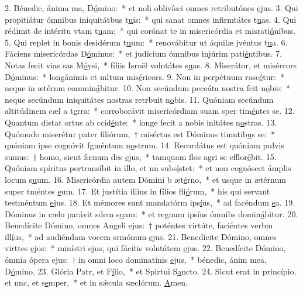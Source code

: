 2. Bénedic, ánima ma, D\uline{ó}mino:~* et noli oblivísci omnes retributónes \uline{e}jus.
3. Qui propitiátur ómnibus iniquitátbus t\uline{u}is:~* qui sanat omnes infirmtátes t\uline{u}as.
4. Qui rédimit de intéritu vtam t\uline{u}am:~* qui corónat te in misericórdia et misrati\uline{ó}nibus.
5. Qui replet in bonis desidérum t\uline{u}um:~* renovábitur ut áquilæ jvéntus t\uline{u}a.
6. Fáciens misericórdas D\uline{ó}minus:~* et judícium ómnibus injúrim pati\uline{é}ntibus.
7. Notas fecit vias sas M\uline{ó}ysi,~* fíliis Israël volntátes s\uline{u}as.
8. Miserátor, et misércors D\uline{ó}minus:~* longánimis et mltum mis\uline{é}ricors.
9. Non in perpétuum rasc\uline{é}tur:~* neque in ætérnm commin\uline{á}bitur.
10. Non secúndum peccáta nostra fcit n\uline{o}bis:~* neque secúndum iniquitátes nostras retrbuit n\uline{o}bis.
11. Quóniam secúndum altitúdinem cæl a t\uline{e}rra:~* corroborávit misericórdiam suam sper tim\uline{é}ntes se.
12. Quantum distat ortus ab ccid\uline{é}nte:~* longe fecit a nobis initátes n\uline{o}stras.
13. Quómodo miserétur pater filiórum,~† misértus est Dóminus timntib\uline{u}s se:~* quóniam ipse cognóvit fgméntum n\uline{o}strum.
14. Recordátus est quóniam pulvis sumus:~† homo, sicut fœnum des \uline{e}jus,~* tamquam flos agri sc efflor\uline{é}bit.
15. Quóniam spíritus pertransíbit in illo, et nn subs\uline{í}stet:~* et non cognóscet ámplis locum s\uline{u}um.
16. Misericórdia autem Dómini b æt\uline{é}rno,~* et usque in ætérnum super tméntes \uline{e}um.
17. Et justítia illíus in fílios fli\uline{ó}rum,~* his qui servant testméntum \uline{e}jus.
18. Et mémores sunt mandatórm ips\uline{í}us,~* ad facéndum \uline{e}a.
19. Dóminus in cælo parávit sdem s\uline{u}am:~* et regnum ipsíus ómnibs domin\uline{á}bitur.
20. Benedícite Dómino, omnes Angeli ejus:~† poténtes virtúte, faciéntes verbm ill\uline{í}us,~* ad audiéndam vocem srmónum \uline{e}jus.
21. Benedícite Dómino, omnes virttes \uline{e}jus:~* minístri ejus, qui fácitis volntátem \uline{e}jus.
22. Benedícite Dómino, ómnia ópera ejus:~† in omni loco dominatinis \uline{e}jus,~* bénedic, ánim mea, D\uline{ó}mino.
23. Glória Patr, et F\uline{í}lio,~* et Spirtui S\uline{a}ncto.
24. Sicut erat in princípio, et nnc, et s\uline{e}mper,~* et in sǽcula sæclórum. \uline{A}men.
